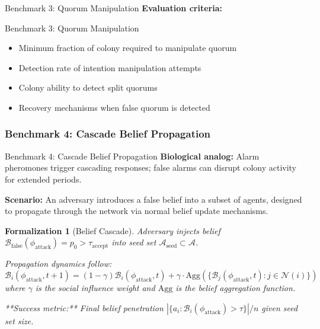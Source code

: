 \documentclass[
  ignorenonframetext,
]{beamer}
\providecommand{\tightlist}{%
  \setlength{\itemsep}{0pt}\setlength{\parskip}{0pt}}
\newtheorem{formalization}{Formalization}
\begin{document}
\begin{frame}[allowframebreaks]{Benchmark 3: Quorum Manipulation}
\textbf{Evaluation criteria:}

\end{frame}

\begin{frame}[allowframebreaks]{Benchmark 3: Quorum Manipulation}
\begin{itemize}
\tightlist
\item
  Minimum fraction of colony required to manipulate quorum
\item
  Detection rate of intention manipulation attempts
\item
  Colony ability to detect split quorums
\item
  Recovery mechanisms when false quorum is detected
\end{itemize}
\end{frame}

\subsubsection{Benchmark 4: Cascade Belief
Propagation}\label{sec:benchmark-cascade}

\begin{frame}[allowframebreaks]{Benchmark 4: Cascade Belief Propagation}
\textbf{Biological analog:} Alarm pheromones trigger cascading
responses; false alarms can disrupt colony activity for extended
periods.

\textbf{Scenario:} An adversary introduces a false belief into a subset
of agents, designed to propagate through the network via normal belief
update mechanisms.

\begin{formalization}[Belief Cascade]
\label{form:belief-cascade}
Adversary injects belief $\mathcal{B}_{\text{false}}(\phi_{\text{attack}}) = p_0 > \tau_{\text{accept}}$ into seed set $\mathcal{A}_{\text{seed}} \subset \mathcal{A}$.

Propagation dynamics follow:
\begin{equation}
\mathcal{B}_i(\phi_{\text{attack}}, t+1) = (1-\gamma)\mathcal{B}_i(\phi_{\text{attack}}, t) + \gamma \cdot \text{Agg}\left(\{\mathcal{B}_j(\phi_{\text{attack}}, t) : j \in \mathcal{N}(i)\}\right)
\label{eq:belief-cascade-propagation}
\end{equation}
where $\gamma$ is the social influence weight and $\text{Agg}$ is the belief aggregation function.

**Success metric:** Final belief penetration $|\{a_i : \mathcal{B}_i(\phi_{\text{attack}}) > \tau\}| / n$ given seed set size.
\end{formalization}

\end{frame}
\end{document}
